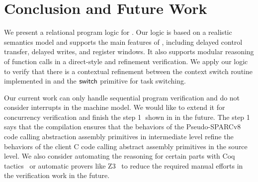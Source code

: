 \section{Conclusion and Future Work}
\label{sec:conclusion}
We present a relational program logic for \sparc.
Our logic is based on a realistic semantics
model and supports the main features of \sparc,
including delayed control transfer, delayed writes,
and register windows.
It also supports modular reasoning of
function calls in a direct-style and
refinement verification.
We apply our logic to verify
that there is a contextual refinement between
the context switch routine implemented
in \sparc{} and 
the $\mathsf{switch}$ primitive for task switching.

Our current work can only handle
sequential \sparc{} program verification and
do not consider interrupts in the machine model.
We would like to extend it for concurrency verification
and finish the step {\color{blue} \textcircled{1}} shown in
\Fig{\ref{fig:idea to establish contextual refinement}} 
in the future. 
The step {\color{blue} \textcircled{1}} says that 
the compilation ensures that the behaviors
of the Pseudo-SPARCv8 code calling abstraction assembly
primitives in intermediate level refine
the behaviors of
the client C code calling abstract assembly primitives
in the source level. 
We also consider automating the reasoning
for certain parts with Coq tactics~\cite{practical-tactics} or automatic provers like Z3~\cite{Z3}
to reduce the required manual efforts in the verification work
in the future.